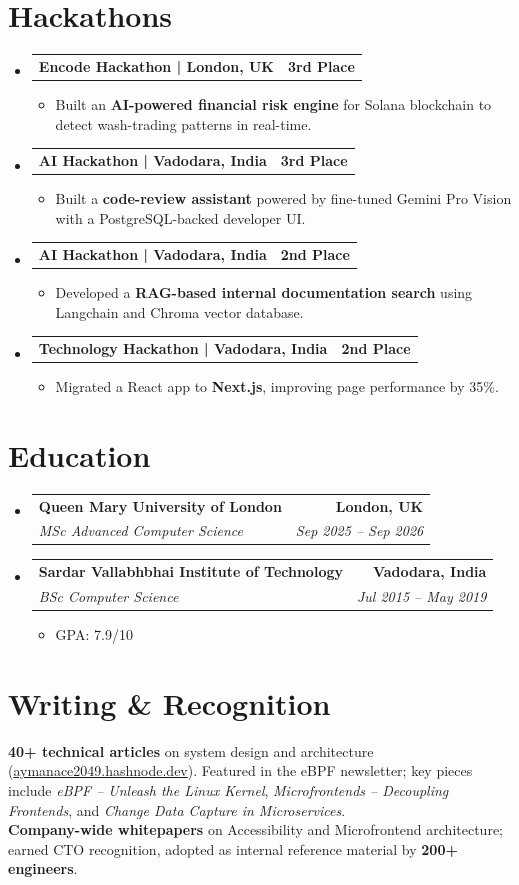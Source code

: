 \documentclass[letterpaper,11pt]{article}
\makeatletter
\newcommand{\resumeItem}[1]{
  \item\small{
    {#1 \vspace{-3pt}}
  }
}
\newcommand{\resumeSubheading}[4]{
  \vspace{-3pt}\item
    \begin{tabular*}{1.0\textwidth}[t]{l@{\extracolsep{\fill}}r}
      \textbf{#1} & \textbf{\small #2} \\
      \textit{\small#3} & \textit{\small #4} \\
    \end{tabular*}\vspace{-7pt}
}
\newcommand{\resumeProjectHeading}[2]{
  \vspace{-3pt}\item
    \begin{tabular*}{1.0\textwidth}[t]{l@{\extracolsep{\fill}}r}
      \textbf{#1} & \textbf{\small #2} \\
    \end{tabular*}\vspace{-7pt}
}
\newcommand{\resumeSubHeadingListStart}{\begin{itemize}[leftmargin=0.0in, label={}]}
\newcommand{\resumeSubHeadingListEnd}{\end{itemize}}
\newcommand{\resumeItemListStart}{\begin{itemize}}
\newcommand{\resumeItemListEnd}{\end{itemize}\vspace{0pt}}
\makeatother
\begin{document}
\section{Hackathons}
\resumeSubHeadingListStart
    \resumeProjectHeading
      {Encode Hackathon | London, UK}{3rd Place}
      \resumeItemListStart
        \resumeItem{Built an \textbf{AI-powered financial risk engine} for Solana blockchain to detect wash-trading patterns in real-time.}
      \resumeItemListEnd
    \resumeProjectHeading
      {AI Hackathon | Vadodara, India}{3rd Place}
      \resumeItemListStart
        \resumeItem{Built a \textbf{code-review assistant} powered by fine-tuned Gemini Pro Vision with a PostgreSQL-backed developer UI.}
      \resumeItemListEnd
    \resumeProjectHeading
      {AI Hackathon | Vadodara, India}{2nd Place}
      \resumeItemListStart
        \resumeItem{Developed a \textbf{RAG-based internal documentation search} using Langchain and Chroma vector database.}
      \resumeItemListEnd
    \resumeProjectHeading
      {Technology Hackathon | Vadodara, India}{2nd Place}
      \resumeItemListStart
        \resumeItem{Migrated a React app to \textbf{Next.js}, improving page performance by 35\%.}
      \resumeItemListEnd
\resumeSubHeadingListEnd

\section{Education}
  \resumeSubHeadingListStart
    \resumeSubheading
      {Queen Mary University of London}{London, UK}
      {MSc Advanced Computer Science}{Sep 2025 -- Sep 2026}
    \resumeSubheading
      {Sardar Vallabhbhai Institute of Technology}{Vadodara, India}
      {BSc Computer Science}{Jul 2015 -- May 2019}
      \resumeItemListStart
        \resumeItem{GPA: 7.9/10}
      \resumeItemListEnd
  \resumeSubHeadingListEnd

\section{Writing \& Recognition}
\small
\textbf{40+ technical articles} on system design and architecture (\href{https://aymanace2049.hashnode.dev}{aymanace2049.hashnode.dev}). Featured in the eBPF newsletter; key pieces include \textit{eBPF -- Unleash the Linux Kernel}, \textit{Microfrontends -- Decoupling Frontends}, and \textit{Change Data Capture in Microservices}. \\[3pt]
\textbf{Company-wide whitepapers} on Accessibility and Microfrontend architecture; earned CTO recognition, adopted as internal reference material by \textbf{200+ engineers}.
\end{document}
